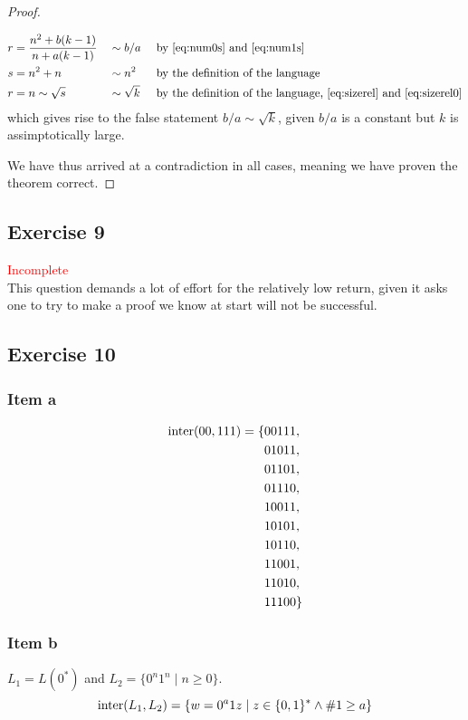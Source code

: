 \documentclass[docid=TP10]{tcom_TP}
\begin{document}
{\begin{proof}
\begin{itemize}
\begin{alignat}{3}
		r &= \frac{n^2+b(k-1)}{n+a(k-1)} &&\sim b/a      &&\text{ by \eqref{eq:num0s} and \eqref{eq:num1s}} \\
		\label{eq:sizerel} s &= n^2+n    &&\sim n^2      &&\text{ by the definition of the language}\\
		r &= n \sim \sqrt{s}             &&\sim \sqrt{k} &&\text{ by  the definition of the language, \eqref{eq:sizerel} and \eqref{eq:sizerel0}}
	\end{alignat}
	which gives rise to the false statement $b/a \sim \sqrt{k}$, given $b/a$ is a constant but $k$ is assimptotically large.
\end{itemize}
We have thus arrived at a contradiction in all cases, meaning we have proven the theorem correct.
\end{proof}
\subsection{Exercise 9}
\textcolor{red}{Incomplete}\\
This question demands a lot of effort for the relatively low return, given it asks one to try to make a proof we know at start will not be successful.
\subsection{Exercise 10}
\subsubsection{Item a}
\begin{alignat*}{2}
	\operatorname{inter}(00,111)=\{&00111,\\
	&01011,\\
	&01101,\\
	&01110,\\
	&10011,\\
	&10101,\\
	&10110,\\
	&11001,\\
	&11010,\\
	&11100\}
\end{alignat*}
\subsubsection{Item b}
$L_1=L(0^*)$ and $L_2=\{0^n1^n\mid n\geq 0\}$.
\begin{equation*}
	\operatorname{inter}(L_1,L_2)=\{w=0^a1z\mid z \in \{0,1\}^* \wedge \#1\geq a\}
\end{equation*}
}
\end{document}
